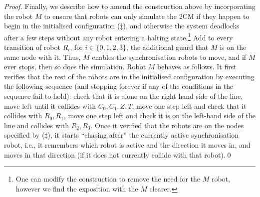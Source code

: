 \documentclass{llncs}
\newcommand{\mover}{\ensuremath{M}}
\newcommand{\round}{\ensuremath{R}}
\newcommand{\zero}{\ensuremath{Z}}
\newcommand{\zeroTest}{\ensuremath{T}}
\newcommand{\counter}{\ensuremath{C}}
\begin{document}
\begin{proof}


Finally, we describe how to amend the construction above by incorporating the robot $\mover$ to ensure that robots can only simulate the 2CM if they happen to begin in the initialised configuration ($\ddagger$), and otherwise the system deadlocks after a few steps without any robot entering a halting state.\footnote{One can modify the construction to remove the need for the $\mover$ robot, however we find the exposition with the $\mover$ clearer.}  Add to every transition of robot $\round_i$, for $i \in \{0,1,2,3\}$, the additional guard that $\mover$ is on the same node with it. Thus, $\mover$ enables the synchronisation robots to move, and if $\mover$ ever stops, then so does the simulation. Robot $\mover$ behaves as follows. It first verifies that the rest of the robots are in the initialised configuration by executing the following sequence (and stopping forever if any of the conditions in the sequence fail to hold): check that it is alone on the right-hand side of the line, move left until it collides with $\counter_0,\counter_1,\zero,\zeroTest$, move one step left and check that it collides with $\round_0,\round_1$, move one step left and check it is on the left-hand side of the line and collides with $\round_2,\round_3$. Once it verified that the robots are on the nodes specified by ($\ddagger$), it starts ``chasing after'' the currently active synchronisation robot, i.e., it remembers which robot is active and the direction it moves in, and moves in that direction (if it does not currently collide with that robot).\qed
\end{proof}
\end{document}
